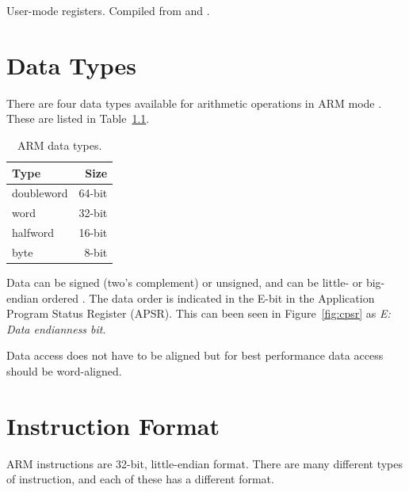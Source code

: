 \documentclass[oneside,a4paper]{report}
\begin{document}
\begin{table}[p]
	\centering
	\singlespacing
	
	\caption{User-mode registers. Compiled from \cite[p. 15]{AAPCS} and \cite[p. 14--15]{iOSABI}.}
	\label{tab:registers}
\end{table}

\chapter{Data Types}

There are four data types available for arithmetic operations in ARM mode \cite[p. 2-14]{A8Ref}. These are listed in Table~\ref{tab:datatypes}.

\begin{table}[htb]
	\centering
	\begin{tabular}{lr}
		\toprule
		Type			&		Size		\\
		\midrule
		doubleword		&		64-bit		\\
		word			& 		32-bit		\\
		halfword 		& 		16-bit		\\
		byte 			& 		8-bit		\\
		\bottomrule
	\end{tabular}
	\caption{ARM data types.}
	\label{tab:datatypes}
\end{table}

Data can be signed (two's complement) or unsigned, and can be little- or big-endian ordered \cite[p. 4-2]{A8Ref}. The data order is indicated in the E-bit in the Application Program Status Register (APSR). This can been seen in Figure~\ref{fig:cpsr} as \emph{E: Data endianness bit}.

Data access does not have to be aligned but for best performance data access should be word-aligned.

\chapter{Instruction Format}

ARM instructions are 32-bit, little-endian format. There are many different types of instruction, and each of these has a different format. 
\end{document}
